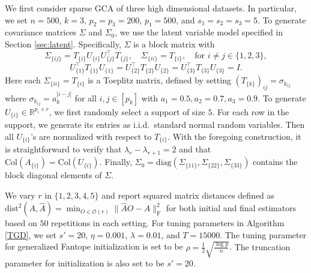 \documentclass[11pt]{article}
\newcommand{\nb}[1]{\textcolor{orange}{\texttt{[#1]}}}
\newcommand{\gsc}[1]{\textcolor{blue}{\texttt{[#1]}}}
\newcommand{\dc}[1]{\{#1\}} %
\newcommand{\hs}{s'}
\newcommand{\0}{{\mathbf{0}}}
\begin{document}
We first consider sparse GCA of three high dimensional datasets. 
In particular, we set $n=500$, $k=3$, $p_2=p_3=200$, $p_1=500$, and $s_1=s_2=s_3=5$. 
To generate covariance matrices $\Sigma$ and $\Sigma_0$, we use the latent variable model specified in Section \ref{sec:latent}. 
Specifically, $\Sigma$ is  a block matrix with
\begin{equation*}
\Sigma_{\dc{ij}}=T_{\dc{i}}U_{\dc{i}}U_{\dc{j}}^\top T_{\dc{j}},\quad \Sigma_{\dc{ii}}=T_{\dc{i}},\quad\text{for $i\neq j \in\{1,2,3\}$},
\end{equation*}\begin{equation*}
    U_{\dc{1}}^\top T_{\dc{1}}U_{\dc{1}}=U_{\dc{2}}^\top T_{\dc{2}}U_{\dc{2}}=U_{\dc{3}}^\top T_{\dc{3}}U_{\dc{3}}=I.
\end{equation*} 
Here each $\Sigma_{\dc{ii}}=T_{\dc{i}}$ is a Toeplitz matrix, defined by setting $(T_{\dc{k}})_{ij}=\sigma_{k_{ij}}$ where $\sigma_{k_{ij}}=a_k^{|i-j|}$ for all $i,j\in [p_k]$ with $a_1=0.5, a_2=0.7, a_3=0.9$. 
To generate $U_{\dc{i}}\in\mathbb{R}^{p_i\times r}$, we first randomly select a support of size $5$. 
For each row in the support, we generate its entries as i.i.d.~standard normal random variables.  
Then all $U_{\dc{i}}$'s are normalized with respect to $T_{\dc{i}}$. 
With the foregoing construction, it is straightforward to verify that $\lambda_{r}-\lambda_{r+1}=2$ and that $\text{Col}(A_{\dc{i}})=\text{Col}(U_{\dc{i}})$. 
Finally, $\Sigma_0 = \mathrm{diag}(\Sigma_{\dc{11}},\Sigma_{\dc{22}},\Sigma_{\dc{33}})$ contains the block diagonal elements of $\Sigma$.

We vary $r$ in $\{1,2,3,4,5\}$ { and report squared matrix distances defined as $\mathrm{dist}^2(A,\widehat{A}) = \min_{O\in\mathcal{O}(r)}\|\widehat{A}O-A\|_\mathrm{F}^2$ for both initial and final estimators based on $50$ repetitions in each setting.}
For tuning parameters in Algorithm \ref{TGD}, we set 
$\hs=20$, $\eta=0.001$, $\lambda = 0.01$, and $T=15000$.
The tuning parameter for generalized Fantope initialization is set to be $\rho = \frac{1}{2}\sqrt{\frac{\log p}{n}}$. 
{The truncation parameter for initialization is also set to be $s' = 20$. }
\end{document}
